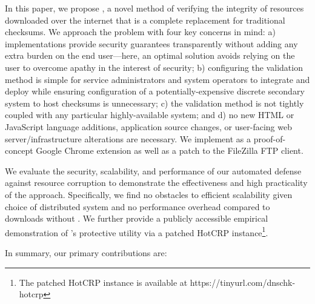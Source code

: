 In this paper, we propose \SYSTEM{}, a novel method of verifying the integrity
of resources downloaded over the internet that is a complete replacement for
traditional checksums. We approach the problem with four key concerns in mind:
a) implementations provide security guarantees transparently without adding any
extra burden on the end user---here, an optimal solution avoids relying on the
user to overcome apathy in the interest of security; b) configuring the
validation method is simple for service administrators and system operators to
integrate and deploy while ensuring configuration of a potentially-expensive
discrete secondary system to host checksums is unnecessary; c) the validation
method is not tightly coupled with any particular highly-available system; and
d) no new HTML or JavaScript language additions, application source changes, or
user-facing web server/infrastructure alterations are necessary. We implement
\SYSTEM{} as a proof-of-concept Google Chrome extension as well as a patch to
the FileZilla FTP client.

We evaluate the security, scalability, and performance of our automated defense
against resource corruption to demonstrate the effectiveness and high
practicality of the \SYSTEM{} approach. Specifically, we find no obstacles to
efficient scalability given choice of distributed system and no performance
overhead compared to downloads without \SYSTEM{}. We further provide a publicly
accessible empirical demonstration of \SYSTEM{}'s protective utility via a
patched HotCRP instance\footnote{The patched HotCRP instance is available at
https://tinyurl.com/dnschk-hotcrp}.

In summary, our primary contributions are:

